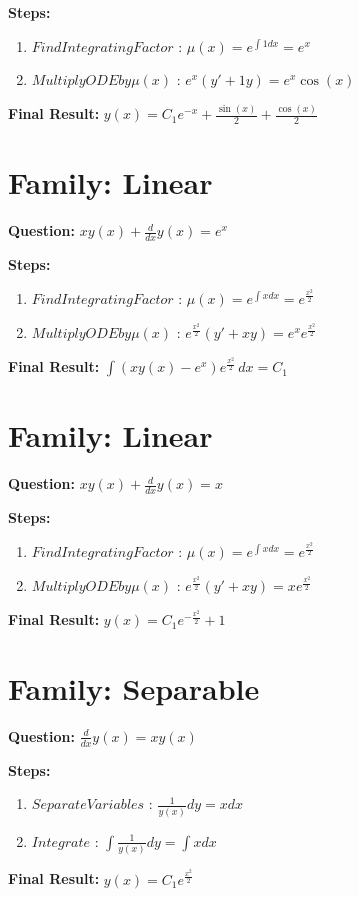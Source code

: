 \documentclass{article}
\begin{document}
\textbf{Steps:}
\begin{enumerate}
\item $Find Integrating Factor$ :  $\mu(x) = e^{\int 1 dx} = e^{x}$
\item $Multiply ODE by \mu(x)$ :  $e^{x}(y' + 1y) = e^{x} \cos{\left(x \right)}$
\end{enumerate}
\textbf{Final Result:} $y{\left(x \right)} = C_{1} e^{- x} + \frac{\sin{\left(x \right)}}{2} + \frac{\cos{\left(x \right)}}{2}$

\section*{Family: Linear}
\textbf{Question:} $x y{\left(x \right)} + \frac{d}{d x} y{\left(x \right)} = e^{x}$

\textbf{Steps:}
\begin{enumerate}
\item $Find Integrating Factor$ :  $\mu(x) = e^{\int x dx} = e^{\frac{x^{2}}{2}}$
\item $Multiply ODE by \mu(x)$ :  $e^{\frac{x^{2}}{2}}(y' + xy) = e^{x} e^{\frac{x^{2}}{2}}$
\end{enumerate}
\textbf{Final Result:} $\int \left(x y{\left(x \right)} - e^{x}\right) e^{\frac{x^{2}}{2}}\, dx = C_{1}$

\section*{Family: Linear}
\textbf{Question:} $x y{\left(x \right)} + \frac{d}{d x} y{\left(x \right)} = x$

\textbf{Steps:}
\begin{enumerate}
\item $Find Integrating Factor$ :  $\mu(x) = e^{\int x dx} = e^{\frac{x^{2}}{2}}$
\item $Multiply ODE by \mu(x)$ :  $e^{\frac{x^{2}}{2}}(y' + xy) = x e^{\frac{x^{2}}{2}}$
\end{enumerate}
\textbf{Final Result:} $y{\left(x \right)} = C_{1} e^{- \frac{x^{2}}{2}} + 1$

\section*{Family: Separable}
\textbf{Question:} $\frac{d}{d x} y{\left(x \right)} = x y{\left(x \right)}$

\textbf{Steps:}
\begin{enumerate}
\item $Separate Variables$ :  $\frac{1}{y{\left(x \right)}} dy = x dx$
\item $Integrate$ :  $\int \frac{1}{y{\left(x \right)}} dy = \int x dx$
\end{enumerate}
\textbf{Final Result:} $y{\left(x \right)} = C_{1} e^{\frac{x^{2}}{2}}$
\end{document}
